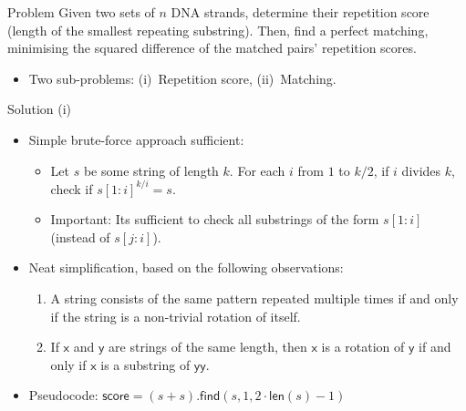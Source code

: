 \begin{slide}
	\begin{block}{Problem}
		Given two sets of $n$ DNA strands, determine their repetition score (length of the smallest repeating substring).
		Then, find a perfect matching, minimising the squared difference of the matched pairs' repetition scores.
	\end{block}
\end{slide}

\begin{slide}
	\begin{itemize}
		\item Two sub-problems: (i)~Repetition score, (ii)~Matching.
	\end{itemize}
	\begin{block}{Solution (i)}
		\begin{itemize}
			\item Simple brute-force approach sufficient:
			\begin{itemize}
				\item
					Let $s$ be some string of length $k$.
					For each $i$ from $1$ to $k / 2$, if $i$ divides $k$, check if $s[1:i]^{k/i} = s$.
				\item Important: Its sufficient to check all substrings of the form $s[1:i]$ (instead of $s[j:i]$).
			\end{itemize}
			\item Neat simplification, based on the following observations:
			\begin{enumerate}
				\item A string consists of the same pattern repeated multiple times if and only if the string is a non-trivial rotation of itself.
				\item If $\mathsf{x}$ and $\mathsf{y}$ are strings of the same length, then $\mathsf{x}$ is a rotation of $\mathsf{y}$ if and only if $\mathsf{x}$ is a substring of $\mathsf{yy}$.
			\end{enumerate}
			\item Pseudocode: $\mathsf{score} = (s + s).\mathsf{find}(s, 1, 2 \cdot \mathsf{len}(s) - 1)$
		\end{itemize}
	\end{block}
\end{slide}


